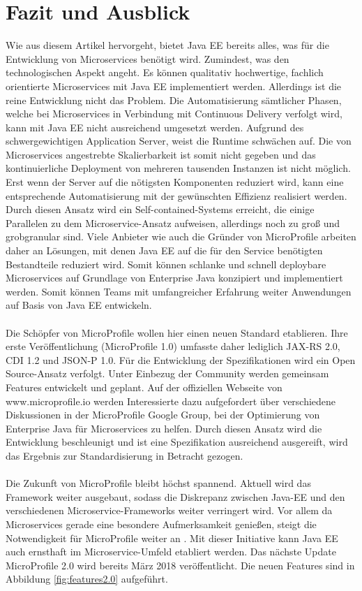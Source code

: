 \section{Fazit und Ausblick}
Wie aus diesem Artikel hervorgeht, bietet Java EE bereits alles, was für die Entwicklung von Microservices benötigt wird. Zumindest, was den technologischen Aspekt angeht. Es können qualitativ hochwertige, fachlich orientierte Microservices mit Java EE implementiert werden. Allerdings ist die reine Entwicklung nicht das Problem. Die Automatisierung sämtlicher Phasen, welche bei Microservices in Verbindung mit Continuous Delivery verfolgt wird, kann mit Java EE nicht ausreichend umgesetzt werden. Aufgrund des schwergewichtigen Application Server, weist die Runtime schwächen auf. Die von Microservices angestrebte Skalierbarkeit ist somit nicht gegeben und das kontinuierliche Deployment von mehreren tausenden Instanzen ist nicht möglich. Erst wenn der Server auf die nötigsten Komponenten reduziert wird, kann eine entsprechende Automatisierung mit der gewünschten Effizienz realisiert werden. Durch diesen Ansatz wird ein Self-contained-Systems erreicht, die einige Parallelen zu dem Microservice-Ansatz aufweisen, allerdings noch zu groß und grobgranular sind. Viele Anbieter wie auch die Gründer von MicroProfile arbeiten daher an Lösungen, mit denen Java EE auf die für den Service benötigten Bestandteile reduziert wird. Somit können schlanke und schnell deploybare Microservices auf Grundlage von Enterprise Java konzipiert und implementiert werden. Somit können Teams mit umfangreicher Erfahrung weiter Anwendungen auf Basis von Java EE entwickeln. \\ \\
Die Schöpfer von MicroProfile wollen hier einen neuen Standard etablieren. Ihre erste Veröffentlichung (MicroProfile 1.0) umfasste daher lediglich JAX-RS 2.0, CDI 1.2 und JSON-P 1.0. Für die Entwicklung der Spezifikationen wird ein Open Source-Ansatz verfolgt. Unter Einbezug der Community werden gemeinsam Features entwickelt und geplant. Auf der offiziellen Webseite von www.microprofile.io werden Interessierte dazu aufgefordert über verschiedene Diskussionen in der MicroProfile Google Group, bei der Optimierung von Enterprise Java für Microservices zu helfen. Durch diesen Ansatz wird die Entwicklung beschleunigt und ist eine Spezifikation ausreichend ausgereift, wird das Ergebnis zur Standardisierung in Betracht gezogen. \\ \\
Die Zukunft von MicroProfile bleibt höchst spannend. Aktuell wird das Framework weiter ausgebaut, sodass die Diskrepanz zwischen Java-EE und den verschiedenen Microservice-Frameworks weiter verringert wird. Vor allem da Microservices gerade eine besondere Aufmerksamkeit genießen, steigt die Notwendigkeit für MicroProfile weiter an \cite{LarsRowekamp.2018}. Mit dieser Initiative kann Java EE auch ernsthaft im Microservice-Umfeld etabliert werden. Das nächste Update MicroProfile 2.0 wird bereits März 2018 veröffentlicht. Die neuen Features sind in Abbildung \ref{fig:features2.0} aufgeführt. 


